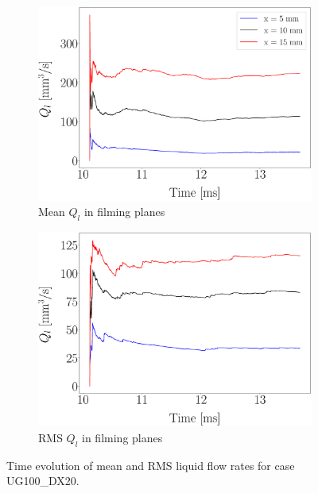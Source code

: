 \begin{figure}[ht]
\begin{subfigure}[b]{0.45\textwidth}
	\centering
   \includegraphics[scale=0.17]{./part2_developments/figures_ch5_resolved_JICF/flow_rates_ibs/uG100_dx20_QL_filming_mean_time_convergence.eps}
   \caption{Mean $Q_l$ in filming planes}
\end{subfigure}
\hfill
\begin{subfigure}[b]{0.45\textwidth}
	\centering
   \includegraphics[scale=0.17]{./part2_developments/figures_ch5_resolved_JICF/flow_rates_ibs/uG100_dx20_QL_filming_RMS_time_convergence.eps}
   \caption{RMS $Q_l$ in filming planes}
\end{subfigure}
\caption{Time evolution of mean and RMS liquid flow rates for case UG100\_DX20.}
\label{fig:IB_liquid_flow_rate_mean_RMS_evolution_UG100_DX20}
\end{figure}

